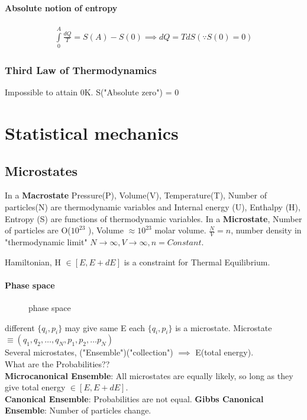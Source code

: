 \subsubsection*{Absolute notion of entropy}
\begin{gather}
    \int \limits_{0}^{A}  \frac{dQ}{T} = S(A) - S(0) \implies  dQ = T dS (\because S(0) = 0)
\end{gather}
\subsection{Third Law of Thermodynamics}
\begin{definition}
    Impossible to attain 0K. S("Absolute zero") = 0
\end{definition}
\chapter{Statistical mechanics}
\section{Microstates}
In a \textbf{Macrostate} Pressure(P), Volume(V), Temperature(T), Number of particles(N) are thermodynamic variables and Internal energy (U), Enthalpy (H), Entropy (S) are functions of thermodynamic variables.\vspace{4pt}
In a \textbf{Microstate}, Number of particles are O(\(10^{23} \) ), Volume \(\approx 10^{23} \) molar volume. \(\frac{N}{V} =n\), number density in "thermodynamic limit" \(N\to \infty , V\to \infty , n = Constant\). 
\begin{figure}[H]
    \centering
    \caption{}
    \label{fig:newbox}
\end{figure}
Hamiltonian, H \(\in [E,E+dE]\)  is a constraint for Thermal Equilibrium. 
\subsubsection*{Phase space}
\begin{figure}[H]
    \centering
    \caption{phase space}
    \label{fig:phasespace}
\end{figure}
different \(\{q_i,p_i\}\) may give same E each \(\{q_i,p_i\}\) is a microstate. 
Microstate \(\equiv (q_1,q_2,\ldots  , q_N, p_1,p_2,\ldots p_{N}  )\)\\
Several microstates, ("Ensemble")("collection") \(\implies \) E(total energy). \\
What are the Probabilities??\\
\textbf{Microcanonical Ensemble}: All microstates are equally likely, so long as they give total energy \(\in[E,E+dE]\). \\
\textbf{Canonical Ensemble}: Probabilities are not equal. 
\textbf{Gibbs Canonical Ensemble}: Number of particles change.
